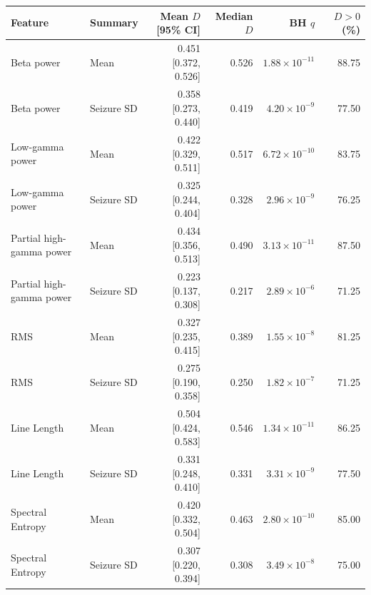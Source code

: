 \begin{tabular}{llrrrr}
\hline
Feature & Summary & Mean $D$ [95\% CI] & Median $D$ & BH $q$ & $D>0$ (\%) \\
\hline
Beta power & Mean & 0.451 [0.372, 0.526] & 0.526 & $1.88\times10^{-11}$ & 88.75 \\
Beta power & Seizure SD & 0.358 [0.273, 0.440] & 0.419 & $4.20\times10^{-9}$ & 77.50 \\
Low-gamma power & Mean & 0.422 [0.329, 0.511] & 0.517 & $6.72\times10^{-10}$ & 83.75 \\
Low-gamma power & Seizure SD & 0.325 [0.244, 0.404] & 0.328 & $2.96\times10^{-9}$ & 76.25 \\
Partial high-gamma power & Mean & 0.434 [0.356, 0.513] & 0.490 & $3.13\times10^{-11}$ & 87.50 \\
Partial high-gamma power & Seizure SD & 0.223 [0.137, 0.308] & 0.217 & $2.89\times10^{-6}$ & 71.25 \\
RMS & Mean & 0.327 [0.235, 0.415] & 0.389 & $1.55\times10^{-8}$ & 81.25 \\
RMS & Seizure SD & 0.275 [0.190, 0.358] & 0.250 & $1.82\times10^{-7}$ & 71.25 \\
Line Length & Mean & 0.504 [0.424, 0.583] & 0.546 & $1.34\times10^{-11}$ & 86.25 \\
Line Length & Seizure SD & 0.331 [0.248, 0.410] & 0.331 & $3.31\times10^{-9}$ & 77.50 \\
Spectral Entropy & Mean & 0.420 [0.332, 0.504] & 0.463 & $2.80\times10^{-10}$ & 85.00 \\
Spectral Entropy & Seizure SD & 0.307 [0.220, 0.394] & 0.308 & $3.49\times10^{-8}$ & 75.00 \\
\hline
\end{tabular}
